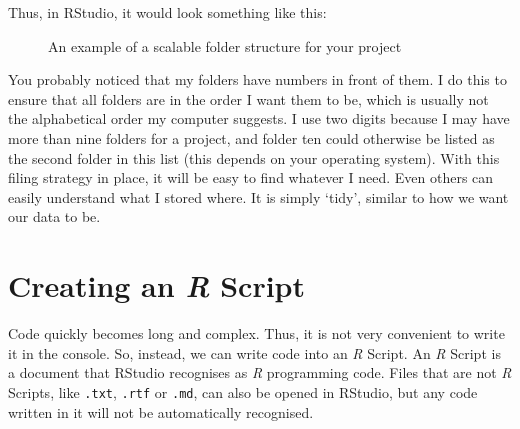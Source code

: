 \documentclass[
  letterpaper,
  DIV=11,
  numbers=noendperiod]{scrreprt}
\begin{document}
Thus, in RStudio, it would look something like this:

\begin{figure}


\caption{\label{fig-folder-structure}An example of a scalable folder
structure for your project}

\end{figure}%

You probably noticed that my folders have numbers in front of them. I do
this to ensure that all folders are in the order I want them to be,
which is usually not the alphabetical order my computer suggests. I use
two digits because I may have more than nine folders for a project, and
folder ten could otherwise be listed as the second folder in this list
(this depends on your operating system). With this filing strategy in
place, it will be easy to find whatever I need. Even others can easily
understand what I stored where. It is simply `tidy', similar to how we
want our data to be.

\section{\texorpdfstring{Creating an \emph{R}
Script}{Creating an R Script}}\label{sec-creating-an-r-script}

Code quickly becomes long and complex. Thus, it is not very convenient
to write it in the console. So, instead, we can write code into an
\emph{R} Script. An \emph{R} Script is a document that RStudio
recognises as \emph{R} programming code. Files that are not \emph{R}
Scripts, like \texttt{.txt}, \texttt{.rtf} or \texttt{.md}, can also be
opened in RStudio, but any code written in it will not be automatically
recognised.
\end{document}
